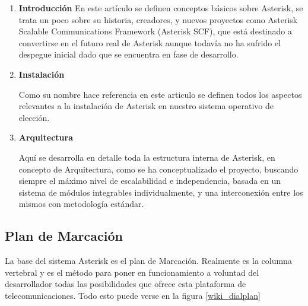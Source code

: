 \begin{enumerate}
	  \setlength{\itemsep}{10pt}

	\item \textbf{Introducción}
	En este artículo se definen conceptos básicos sobre Asterisk, se trata un poco sobre su historia, creadores, y nuevos proyectos como Asterisk Scalable Communications Framework (Asterisk SCF), que está destinado a convertirse en el futuro real de Asterisk aunque todavía no ha sufrido el despegue inicial dado que se encuentra en fase de desarrollo.
	
	\item \textbf{Instalación}
	
	Como su nombre hace referencia en este articulo se definen todos los aspectos relevantes a la instalación de Asterisk en nuestro sistema operativo de elección.
	
	\item \textbf{Arquitectura}
	
	Aquí se desarrolla en detalle toda la estructura interna de Asterisk, en concepto de Arquitectura, como se ha conceptualizado el proyecto, buscando siempre el máximo nivel de escalabilidad e independencia, basada en un sistema de módulos integrables individualmente, y una interconexión entre los mismos con metodología estándar.
	
\end{enumerate}


\subsection{Plan de Marcación}

La base del sistema Asterisk es el plan de Marcación. Realmente es la columna vertebral y es el método para poner en funcionamiento a voluntad del desarrollador todas las posibilidades que ofrece esta plataforma de telecomunicaciones. Todo esto puede verse en la figura \ref{wiki_dialplan}


